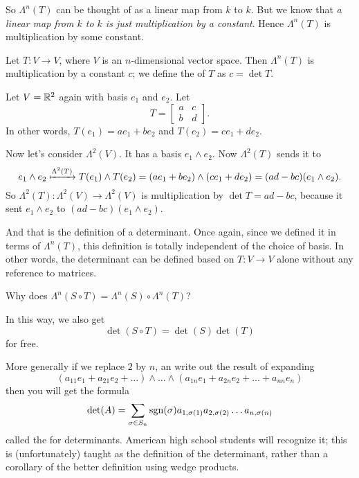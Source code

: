 So $\Lambda^n(T)$ can be thought of as a linear map from $k$ to $k$.
But we know that \emph{a linear map from $k$ to $k$ is just multiplication by a constant}.
Hence $\Lambda^n(T)$ is multiplication by some constant.
\begin{definition}
	Let $T \colon V \to V$, where $V$ is an $n$-dimensional vector space.
	Then $\Lambda^n(T)$ is multiplication by a constant $c$;
	we define the  of $T$ as $c = \det T$.
\end{definition}

\begin{example}
	Let $V = \mathbb R^2$ again with basis $e_1$ and $e_2$.
	Let
	\[ T = \begin{bmatrix}
			a & c \\ b & d
		\end{bmatrix}.
	\]
	In other words, $T(e_1) = ae_1 + be_2$
	and $T(e_2) = ce_1 + de_2$.

	Now let's consider $\Lambda^2(V)$.
	It has a basis $e_1 \wedge e_2$.
	Now $\Lambda^2(T)$ sends it to
	\[ e_1 \wedge e_2 \xmapsto{\Lambda^2(T)}
		T(e_1) \wedge T(e_2) =
		(ae_1 + be_2) \wedge (ce_1 + de_2)
		= (ad-bc)(e_1 \wedge e_2).
	\]
	So $\Lambda^2(T) \colon \Lambda^2(V) \to \Lambda^2(V)$
	is multiplication by $\det T = ad-bc$,
	because it sent $e_1 \wedge e_2$ to
	$(ad-bc)(e_1 \wedge e_2)$.
\end{example}
And that is the definition of a determinant.
Once again, since we defined it in terms of $\Lambda^n(T)$,
this definition is totally independent of the choice of basis.
In other words, the determinant can be defined based on $T \colon V \to V$ alone
without any reference to matrices.

\begin{ques}
	Why does $\Lambda^n(S \circ T) = \Lambda^n(S) \circ \Lambda^n(T)$?
\end{ques}
In this way, we also get \[ \det(S \circ T) = \det(S) \det(T) \] for free.

More generally if we replace $2$ by $n$,
an write out the result of expanding
\[ \left( a_{11}e_1 + a_{21}e_2 + \dots \right) \wedge \dots \wedge
	\left( a_{1n}e_1 + a_{2n}e_2 + \dots + a_{nn} e_n \right) \]
then you will get the formula
\[ \det(A) = \sum_{\sigma \in S_n} \operatorname{sgn}(\sigma)
	a_{1, \sigma(1)} a_{2, \sigma(2)} \dots a_{n, \sigma(n)} \]
called the  for determinants.
American high school students will recognize it;
this is (unfortunately) taught as the definition of the determinant,
rather than a corollary of the better definition using wedge products.

